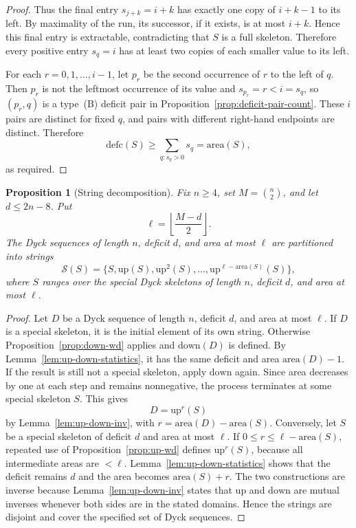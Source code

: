 \documentclass[11pt]{article}
\theoremstyle{plain}
\newtheorem{proposition}[theorem]{Proposition}
\theoremstyle{definition}
\theoremstyle{remark}
\newcommand{\area}{\mathrm{area}}
\newcommand{\defc}{\mathrm{defc}}
\begin{document}
\begin{proof}
Thus the final entry \(s_{j+k}=i+k\) has exactly one copy of \(i+k-1\) to its
left.  By maximality of the run, its successor, if it exists, is at most
\(i+k\).  Hence this final entry is extractable, contradicting that \(S\) is a
full skeleton.  Therefore every positive entry \(s_q=i\) has at least two
copies of each smaller value to its left.

For each \(r=0,1,\ldots,i-1\), let \(p_r\) be the second occurrence of \(r\)
to the left of \(q\).  Then \(p_r\) is not the leftmost occurrence of its
value and \(s_{p_r}=r<i=s_q\), so \((p_r,q)\) is a type~\textup{(B)} deficit
pair in Proposition~\ref{prop:deficit-pair-count}.  These \(i\) pairs are
distinct for fixed \(q\), and pairs with different right-hand endpoints are
distinct.  Therefore
\[
  \defc(S)\ge \sum_{q:s_q>0}s_q=\area(S),
\]
as required.
\end{proof}
\begin{proposition}[String decomposition]
\label{prop:decomposition}
Fix \(n\ge 4\), set \(M=\binom n2\), and let \(d\le 2n-8\).  Put
\[
  \ell=\left\lfloor\frac{M-d}{2}\right\rfloor .
\]
The Dyck sequences of length \(n\), deficit \(d\), and area at most \(\ell\)
are partitioned into strings
\[
  \mathcal S(S)=
  \bigl\{S,\mathrm{up}(S),\mathrm{up}^2(S),\ldots,
  \mathrm{up}^{\ell-\area(S)}(S)\bigr\},
\]
where \(S\) ranges over the special Dyck skeletons of length \(n\), deficit
\(d\), and area at most \(\ell\).
\end{proposition}
\begin{proof}
Let \(D\) be a Dyck sequence of length \(n\), deficit \(d\), and area at most
\(\ell\).  If \(D\) is a special skeleton, it is the initial element of its own
string.  Otherwise Proposition~\ref{prop:down-wd} applies and
\(\mathrm{down}(D)\) is defined.  By Lemma~\ref{lem:up-down-statistics}, it has
the same deficit and area \(\area(D)-1\).  If the result is still not a special
skeleton, apply \(\mathrm{down}\) again.  Since area decreases by one at each
step and remains nonnegative, the process terminates at some special skeleton
\(S\).  This gives
\[
  D=\mathrm{up}^r(S)
\]
by Lemma~\ref{lem:up-down-inv}, with \(r=\area(D)-\area(S)\).
Conversely, let \(S\) be a special skeleton of deficit \(d\) and area at most
\(\ell\).  If \(0\le r\le \ell-\area(S)\), repeated use of
Proposition~\ref{prop:up-wd} defines \(\mathrm{up}^r(S)\), because all
intermediate areas are \(<\ell\).  Lemma~\ref{lem:up-down-statistics} shows that
the deficit remains \(d\) and the area becomes \(\area(S)+r\).
The two constructions are inverse because Lemma~\ref{lem:up-down-inv} states
that \(\mathrm{up}\) and \(\mathrm{down}\) are mutual inverses whenever both
sides are in the stated domains.  Hence the strings are disjoint and cover the
specified set of Dyck sequences.
\end{proof}
\end{document}
